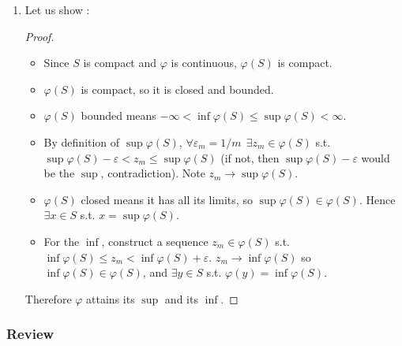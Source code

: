 \documentclass{article}
\begin{document}
\begin{enumerate}
  \item Let us show :
    \begin{proof}
      \begin{itemize}[label=$\bullet$]
        \item Since $S$ is compact and $\varphi$ is continuous, $\varphi(S)$ is compact.

        \item $\varphi(S)$ is compact, so it is closed and bounded.

        \item $\varphi(S)$ bounded means $-\infty < \inf \varphi(S) \le \sup \varphi(S) < \infty$.

        \item By definition of $\sup \varphi(S)$, $\forall \varepsilon_m = 1/m ~~ \exists z_m \in \varphi(S)$ s.t. $\sup \varphi(S) - \varepsilon < z_m \le \sup \varphi(S)$ (if not, then $\sup \varphi(S) - \varepsilon$ would be the $\sup$, contradiction). Note $z_m \to \sup \varphi(S)$.

        \item $\varphi(S)$ closed means it has all its limits, so $\sup \varphi(S) \in \varphi(S)$. Hence $\exists x \in S$ s.t. $x = \sup \varphi(S)$.

        \item For the $\inf$, construct a sequence $z_m \in \varphi(S)$ s.t. $\inf \varphi(S) \le z_m < \inf \varphi(S) + \varepsilon$. $z_m \to \inf \varphi(S)$ so $\inf \varphi(S) \in \varphi(S)$, and $\exists y \in S$ s.t. $\varphi(y) = \inf \varphi(S)$.
      \end{itemize}

      Therefore $\varphi$ attains its $\sup$ and its $\inf$.
    \end{proof}
\end{enumerate}

\subsubsection{Review}
\label{ssub:review}
\end{document}
